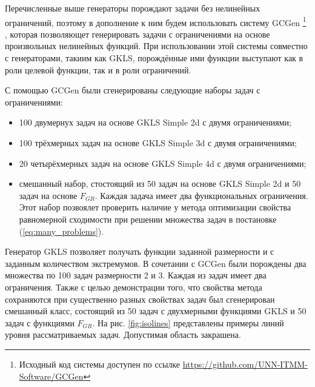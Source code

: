 Перечисленные выше генераторы порождают задачи без нелинейных ограничений, поэтому в дополнение к ним будем использовать
систему GCGen \footnote{Исходный код системы доступен по ссылке \url{https://github.com/UNN-ITMM-Software/GCGen}}
\cite{GergelBarkalov2019}, которая позволяющет генерировать задачи с ограничениями на основе произвольных нелинейных
функций. При использовании этой системы совместно с генераторами, такиим как GKLS, порождённые ими функции выступают как
в роли целевой функции, так и в роли ограничений.

С помощью GCGen были сгенерированы следующие наборы задач с ограничениями:
\begin{itemize}
  \item 100 двумернух задач на основе GKLS Simple 2d с двумя ограничениями;
  \item 100 трёхмерных задач на основе GKLS Simple 3d с двумя ограничениями;
  \item 20 четырёхмерных задач на основе GKLS Simple 4d с двумя ограничениями;
  \item смешанный набор, стостоящий из 50 задач на основе GKLS Simple 2d и 50 задач на основе \(F_{GR}\).
  Каждая задача имеет два функциональных ограничения. Этот набор позвоялет проверить наличие у метода оптимизации
  свойства равномерной сходимости при решении множества задач в постановке (\ref{eq:many_problems}).
\end{itemize}

Генератор GKLS \cite{Gaviano2003} позволяет получать функции заданной размерности и с заданным количеством экстремумов.
В сочетании с GCGen были порождены два множества по 100 задач размерности 2 и 3. Каждая из задач имеет два ограничения.
Также с целью демонстрации того, что свойства метода сохраняются при существенно разных свойствах задач
был сгенерирован смешанный класс, состоящий из 50 задач с двухмерными функциями GKLS и 50 задач с функциями \(F_{GR}\).
На рис. \ref{fig:isolines} представлены примеры линий уровня рассматриваемых задач. Допустимая область закрашена.

